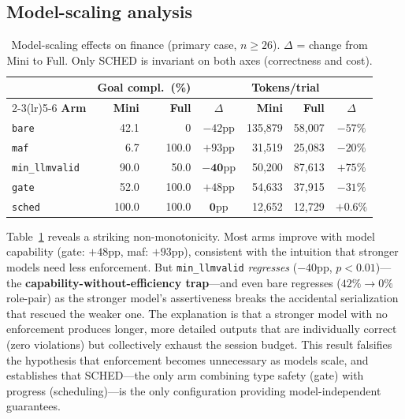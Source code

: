 \subsection{Model-scaling analysis}\label{sec:scaling}

\begin{table}[t]
\centering\small
\caption{Model-scaling effects on finance (primary case, $n \geq 26$).
$\Delta$ = change from Mini to Full.
Only SCHED is invariant on both axes (correctness and cost).}
\label{tab:scaling}
\begin{tabular}{@{}l rr c rr c@{}}
\toprule
& \multicolumn{2}{c}{\textbf{Goal compl.\ (\%)}} & &
  \multicolumn{2}{c}{\textbf{Tokens/trial}} & \\
\cmidrule(lr){2-3}\cmidrule(lr){5-6}
\textbf{Arm} & \textbf{Mini} & \textbf{Full} & $\Delta$
             & \textbf{Mini} & \textbf{Full} & $\Delta$ \\
\midrule
\texttt{bare}        & 42.1 &   0   & $-42$pp    & 135{,}879 & 58{,}007 & $-57\%$ \\
\texttt{maf}         &  6.7 & 100.0 & $+93$pp    &  31{,}519 & 25{,}083 & $-20\%$ \\
\texttt{min\_llmvalid} & 90.0 &  50.0 & $\mathbf{-40}$pp & 50{,}200 & 87{,}613 & $+75\%$ \\
\texttt{gate}        & 52.0 & 100.0 & $+48$pp    &  54{,}633 & 37{,}915 & $-31\%$ \\
\texttt{sched}       & 100.0 & 100.0 & $\mathbf{0}$pp & 12{,}652 & 12{,}729 & $+0.6\%$ \\
\bottomrule
\end{tabular}
\end{table}

Table~\ref{tab:scaling} reveals a striking non-monotonicity.
Most arms improve with model capability (gate: $+48$pp, maf: $+93$pp),
consistent with the intuition that stronger models need less
enforcement.
But \texttt{min\_llmvalid} \emph{regresses} ($-40$pp, $p < 0.01$)---the
\textbf{capability-without-efficiency trap}---and even bare regresses
($42\% \to 0\%$ role-pair) as the stronger model's assertiveness
breaks the accidental serialization that rescued the weaker one.
The explanation is that a stronger model with no enforcement produces
longer, more detailed outputs that are individually correct (zero
violations) but collectively exhaust the session budget.
This result falsifies the hypothesis that enforcement becomes
unnecessary as models scale, and establishes that SCHED---the only
arm combining type safety (gate) with progress (scheduling)---is
the only configuration providing model-independent guarantees.

